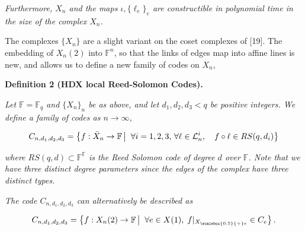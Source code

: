 \documentclass[10pt,a4paper]{article}
\begin{document}
\emph{Furthermore, $X_{n}$ and the maps $\iota,\{\ell_{e}\}_{e}$ are constructible in polynomial time in the size of the complex $X_{n}$.}\par






The complexes $\{X_{n}\}$ are a slight variant on the coset complexes of [19].
The embedding of $X_{n}(2)$ into $\mathbb{F}^{n}$, so that the links of edges map into affine lines is new, and allows us to define a new family of codes on $X_{n}$,\par





\par\medskip\noindent\textbf{
\textbf{Definition 2}\textbf{ }(HDX local Reed-Solomon Codes)\textbf{.}
}\par



\emph{Let $\mathbb{F}=\mathbb{F}_{q}$ and $\{X_{n}\}_{n}$ be as above, and let $d_{1},d_{2},d_{3}<q$ be positive integers. We define a family of codes as $n\to\infty$,}\par


\[\begin{gathered}
\displaystyle C_{n,d_{1},d_{2},d_{3}} \displaystyle=\left\{f:\bar{X}_{n}\to\mathbb{F}\left|\;\vphantom{f:\bar{X}_{n}\to\mathbb{F}\forall i=1,2,3,\,\forall\ell\in{\cal L}_{n}^{i},\quad f\circ\ell\in RS(q,d_{i})}\right.\forall i=1,2,3,\,\forall\ell\in{\cal L}_{n}^{i},\quad f\circ\ell\in RS(q,d_{i})\right\}
\end{gathered}\]


\emph{where $RS(q,d)\subset\mathbb{F}^{\mathbb{F}}$ is the Reed Solomon code of degree $d$ over $\mathbb{F}$. Note that we have three distinct degree parameters since the edges of the complex have three distinct types.}\par




\emph{The code $C_{n,d_{1},d_{2},d_{3}}$ can alternatively be described as}\par


\[\begin{gathered}
\displaystyle C_{n,d_{1},d_{2},d_{3}} \displaystyle=\left\{f:X_{n}(2)\to\mathbb{F}\left|\;\vphantom{f:X_{n}(2)\to\mathbb{F}\forall e\in X(1),\;f|_{{X}_{\scalebox{0.5}{+}e}}\in C_{e}}\right.\forall e\in X(1),\;f|_{{X}_{\scalebox{0.5}{+}e}}\in C_{e}\right\}.
\end{gathered}\]
\end{document}
